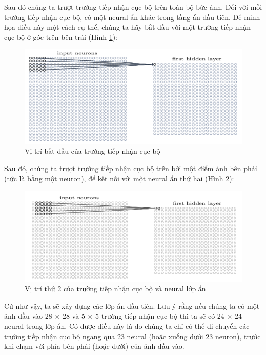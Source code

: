 Sau đó chúng ta trượt trường tiếp nhận cục bộ trên toàn bộ bức ảnh. Đối với 
mỗi trường tiếp nhận cục bộ, có một neural ẩn khác trong tầng ẩn đầu tiên. Để minh 
họa điều này một cách cụ thể, chúng ta hãy bắt đầu với một trường tiếp nhận cục 
bộ ở góc trên bên trái (Hình \ref{fig:truongtiepnhancucbo}):
\begin{figure}[H]
	\centering
	\includegraphics[width=1\linewidth]{images/truongtiepnhancucbo.png}
	\caption{Vị trí bắt đầu của trường tiếp nhận cục bộ}
	\label{fig:truongtiepnhancucbo}
\end{figure}
Sau đó, chúng ta trượt trường tiếp nhận cục bộ trên bởi một điểm ảnh bên 
phải (tức là bằng một neuron), để kết nối với một neural ẩn thứ hai (Hình \ref{fig:truongtiepnhancucbo2}):
\begin{figure}[H]
	\centering
	\includegraphics[width=1\linewidth]{images/truongtiepnhancucbo2.png}
	\caption{Vị trí thứ 2 của trường tiếp nhận cục bộ và neural lớp ẩn}
	\label{fig:truongtiepnhancucbo2}
\end{figure}
Cứ như vậy, ta sẽ xây dựng các lớp ẩn đầu tiên. Lưu ý rằng nếu chúng ta có một ảnh đầu vào 28 × 28 và 5 × 5 trường tiếp nhận cục bộ thì ta sẽ có 24 × 24 neural trong lớp ẩn. Có được điều này là do chúng ta chỉ có thể di chuyển các trường tiếp nhận cục bộ ngang qua 23 neural (hoặc xuống dưới 23 neuron), trước khi chạm với phía bên phải (hoặc dưới) của ảnh đầu vào.
 
